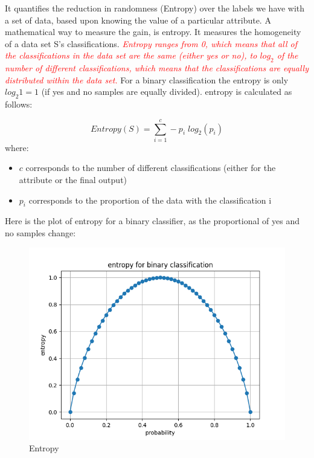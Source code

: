 \documentclass[12pt]{report}
\begin{document}
It quantifies the reduction in randomness (Entropy) over the labels we have with a set of data, based upon knowing the value of a particular attribute. A mathematical way to measure the gain, is entropy. It measures the homogeneity of a data set S's  classifications. \textcolor{red}{\textit{Entropy ranges from 0, which means that all of the classifications in the data set are the same (either yes or no), to $log_{2}$ of the number of different classifications, which means that the classifications are equally distributed within the data set.}} For a binary classification the entropy is only $log_{2} 1 = 1$ (if yes and no samples are equally divided). entropy is calculated as follows:

\begin{equation}
Entropy(S) = \sum_{i=1}^{c} -p_{i} \; log_{2} (p_{i})
\end{equation}
where:
\begin{itemize}
\item $c$ corresponds to the number of different classifications (either for the attribute or the final output)
\item $p_{i}$ corresponds to the proportion of the data with the classification i
\end{itemize}

Here is the plot of entropy for a binary classifier, as the proportional of yes and no samples change:


\begin{figure}[H]
	\centering
	\caption{Entropy}
	\includegraphics[scale=0.5]{entroy.png}
\end{figure}
\end{document}
